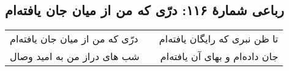 \begin{center}
\section*{رباعی شمارهٔ ۱۱۶:  درّی که من از میان جان یافته‌ام}
\label{sec:116}
\begin{longtable}{l p{0.5cm} r}
 درّی که من از میان جان یافته‌ام
&&
تا ظن نبری که رایگان یافته‌ام
\\
شب های دراز من به امید وصال
&&
جان داده‌ام و بهای آن یافته‌ام
\\
\end{longtable}
\end{center}
